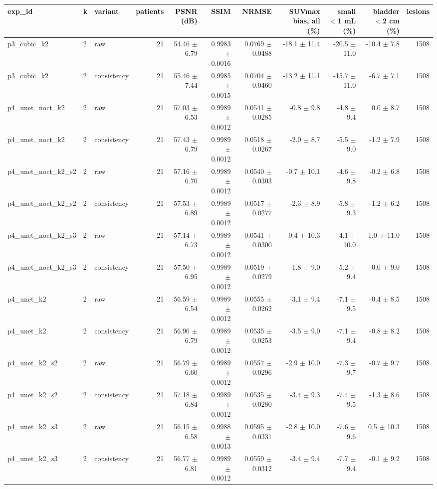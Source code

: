 \begin{tabular}{lllrrrrrrrr}
\toprule
exp\_id & k & variant & patients & PSNR (dB) & SSIM & NRMSE & SUVmax bias, all (\%) & small $<$1 mL (\%) & bladder $<$2 cm (\%) & lesions \\
\midrule
p3\_cubic\_k2 & 2 & raw & 21 & 54.46 $\pm$ 6.79 & 0.9983 $\pm$ 0.0016 & 0.0769 $\pm$ 0.0488 & -18.1 $\pm$ 11.4 & -20.5 $\pm$ 11.0 & -10.4 $\pm$ 7.8 & 1508 \\
p3\_cubic\_k2 & 2 & consistency & 21 & 55.46 $\pm$ 7.44 & 0.9985 $\pm$ 0.0015 & 0.0704 $\pm$ 0.0460 & -13.2 $\pm$ 11.1 & -15.7 $\pm$ 11.0 & -6.7 $\pm$ 7.1 & 1508 \\
p4\_unet\_noct\_k2 & 2 & raw & 21 & 57.03 $\pm$ 6.53 & 0.9989 $\pm$ 0.0012 & 0.0541 $\pm$ 0.0285 & -0.8 $\pm$ 9.8 & -4.8 $\pm$ 9.4 & 0.0 $\pm$ 8.7 & 1508 \\
p4\_unet\_noct\_k2 & 2 & consistency & 21 & 57.43 $\pm$ 6.79 & 0.9989 $\pm$ 0.0012 & 0.0518 $\pm$ 0.0267 & -2.0 $\pm$ 8.7 & -5.5 $\pm$ 9.0 & -1.2 $\pm$ 7.9 & 1508 \\
p4\_unet\_noct\_k2\_s2 & 2 & raw & 21 & 57.16 $\pm$ 6.70 & 0.9989 $\pm$ 0.0012 & 0.0540 $\pm$ 0.0303 & -0.7 $\pm$ 10.1 & -4.6 $\pm$ 9.8 & -0.2 $\pm$ 6.8 & 1508 \\
p4\_unet\_noct\_k2\_s2 & 2 & consistency & 21 & 57.53 $\pm$ 6.89 & 0.9989 $\pm$ 0.0012 & 0.0517 $\pm$ 0.0277 & -2.3 $\pm$ 8.9 & -5.8 $\pm$ 9.3 & -1.2 $\pm$ 6.2 & 1508 \\
p4\_unet\_noct\_k2\_s3 & 2 & raw & 21 & 57.14 $\pm$ 6.73 & 0.9989 $\pm$ 0.0012 & 0.0541 $\pm$ 0.0300 & -0.4 $\pm$ 10.3 & -4.1 $\pm$ 10.0 & 1.0 $\pm$ 11.0 & 1508 \\
p4\_unet\_noct\_k2\_s3 & 2 & consistency & 21 & 57.50 $\pm$ 6.95 & 0.9989 $\pm$ 0.0012 & 0.0519 $\pm$ 0.0279 & -1.8 $\pm$ 9.0 & -5.2 $\pm$ 9.4 & -0.0 $\pm$ 9.0 & 1508 \\
p4\_unet\_k2 & 2 & raw & 21 & 56.59 $\pm$ 6.54 & 0.9989 $\pm$ 0.0012 & 0.0555 $\pm$ 0.0262 & -3.1 $\pm$ 9.4 & -7.1 $\pm$ 9.5 & -0.4 $\pm$ 8.5 & 1508 \\
p4\_unet\_k2 & 2 & consistency & 21 & 56.96 $\pm$ 6.79 & 0.9989 $\pm$ 0.0012 & 0.0535 $\pm$ 0.0253 & -3.5 $\pm$ 9.0 & -7.1 $\pm$ 9.4 & -0.8 $\pm$ 8.2 & 1508 \\
p4\_unet\_k2\_s2 & 2 & raw & 21 & 56.79 $\pm$ 6.60 & 0.9989 $\pm$ 0.0012 & 0.0557 $\pm$ 0.0296 & -2.9 $\pm$ 10.0 & -7.3 $\pm$ 9.7 & -0.7 $\pm$ 9.7 & 1508 \\
p4\_unet\_k2\_s2 & 2 & consistency & 21 & 57.18 $\pm$ 6.84 & 0.9989 $\pm$ 0.0012 & 0.0535 $\pm$ 0.0280 & -3.4 $\pm$ 9.3 & -7.4 $\pm$ 9.5 & -1.3 $\pm$ 8.6 & 1508 \\
p4\_unet\_k2\_s3 & 2 & raw & 21 & 56.15 $\pm$ 6.58 & 0.9988 $\pm$ 0.0013 & 0.0595 $\pm$ 0.0331 & -2.8 $\pm$ 10.0 & -7.6 $\pm$ 9.6 & 0.5 $\pm$ 10.3 & 1508 \\
p4\_unet\_k2\_s3 & 2 & consistency & 21 & 56.77 $\pm$ 6.81 & 0.9989 $\pm$ 0.0012 & 0.0559 $\pm$ 0.0312 & -3.4 $\pm$ 9.4 & -7.7 $\pm$ 9.4 & -0.1 $\pm$ 9.2 & 1508 \\
\bottomrule
\end{tabular}
